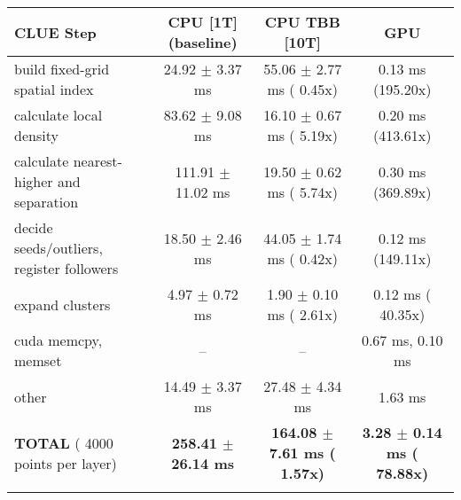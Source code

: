     \begin{tabular}{l|c|c|c}
    \hline
    CLUE Step                                 & CPU [1T] (baseline)         & CPU TBB [10T]                         & GPU                       \\ \hline
    build fixed-grid spatial index            &  24.92 $\pm$  3.37 ms       &  55.06 $\pm$  2.77 ms ( 0.45x)        &   0.13 ms (195.20x)       \\
    calculate local density                   &  83.62 $\pm$  9.08 ms       &  16.10 $\pm$  0.67 ms ( 5.19x)        &   0.20 ms (413.61x)       \\
    calculate nearest-higher and separation   & 111.91 $\pm$ 11.02 ms       &  19.50 $\pm$  0.62 ms ( 5.74x)        &   0.30 ms (369.89x)       \\
    decide seeds/outliers, register followers &  18.50 $\pm$  2.46 ms       &  44.05 $\pm$  1.74 ms ( 0.42x)        &   0.12 ms (149.11x)       \\
    expand clusters                           &   4.97 $\pm$  0.72 ms       &   1.90 $\pm$  0.10 ms ( 2.61x)        &   0.12 ms ( 40.35x)       \\ \hline
    cuda memcpy, memset                       & --                          & --                                    &   0.67 ms,   0.10 ms      \\ 
    other                                     &  14.49 $\pm$  3.37 ms       &  27.48 $\pm$  4.34 ms                 &   1.63 ms                 \\ \hline
    \textbf{TOTAL} ( 4000 points per layer)   & \textbf{258.41 $\pm$ 26.14 ms} & \textbf{164.08 $\pm$  7.61 ms ( 1.57x)} & \textbf{  3.28 $\pm$  0.14 ms ( 78.88x)}  \\
    \hline
    \multicolumn{4}{c}{} 
    \end{tabular}
    \linebreak



